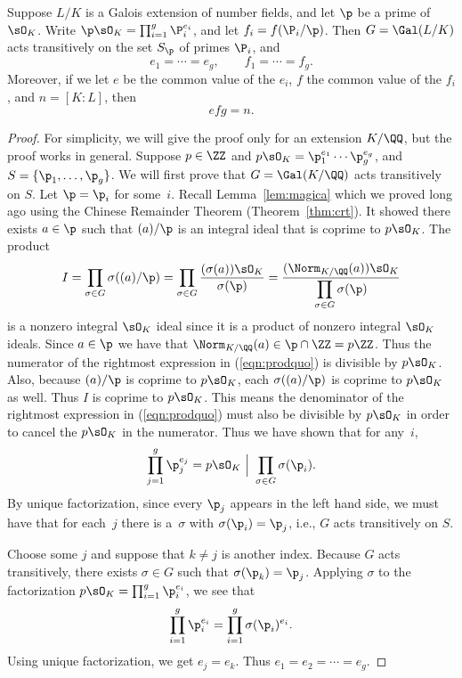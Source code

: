 \begin{theorem}\label{thm:transitive}
  Suppose $L/K$ is a Galois extension of number fields,
  and let $\p$ be a prime of $\sO_K$.
  Write $\p\sO_K = \prod_{i=1}^g \P_i^{e_i}$, and let $f_i = f(\P_i/\p)$.
  Then $G = \Gal(L/K)$ acts transitively on the set $S_\p$ of primes $\P_i$,
  and
  \[
    e_1 = \cdots = e_g, \qquad f_1 = \cdots = f_g.
  \]
  Moreover, if we let $e$ be the common value of the $e_i$,
  $f$ the common value of the $f_i$, and $n = [K:L]$, then
  \[
    efg = n.
  \]
\end{theorem}
\begin{proof}
  For simplicity, we will give the proof only for an extension $K/\QQ$, but
  the proof works in general. Suppose $p \in \ZZ$ and
  $p\sO_K = \p_1^{e_1}\cdots \p_g^{e_g}$, and $S = \{\p_1,\ldots, \p_g\}$.  We
  will first prove that $G = \Gal(K/\QQ)$ acts transitively on $S$.
  Let $\p = \p_i$ for some~$i$.
  Recall Lemma~\ref{lem:magica} which we proved long ago using the
  Chinese Remainder Theorem (Theorem~\ref{thm:crt}). It showed there exists
  $a\in\p$ such that $(a)/\p$ is an integral ideal that is
  coprime to $p\sO_K$.   The product
  \begin{equation}\label{eqn:prodquo}
    I = \prod_{\sigma\in G} \sigma((a)/\p)
    = \prod_{\sigma\in G} \frac{(\sigma(a))\sO_K}{\sigma(\p)}
    = \frac{(\Norm_{K/\QQ}(a))\sO_K}{\displaystyle \prod_{\sigma\in G} \sigma(\p)}
  \end{equation}
  is a nonzero integral $\sO_K$ ideal since it is a product of nonzero
  integral $\sO_K$ ideals.
  Since $a\in \p$ we have that
  $\Norm_{K/\QQ}(a) \in \p\cap\ZZ=p\ZZ$.  Thus the numerator of
  the rightmost expression in (\ref{eqn:prodquo}) is
  divisible by $p\sO_K$.   Also, because $(a)/\p$ is coprime
  to $p\sO_K$, each $\sigma((a)/\p)$ is coprime to $p\sO_K$
  as well.   Thus $I$ is coprime to $p\sO_K$.   This means the
  denominator of the rightmost expression in (\ref{eqn:prodquo})
  must also be divisible by $p\sO_K$ in order to cancel the $p\sO_K$
  in the numerator.  Thus we have shown that for any~$i$,
  \[
    \prod_{j=1}^g \p_j^{e_j}
    = p\sO_K \,\,\Big|\,\, \prod_{\sigma\in G} \sigma(\p_i).
  \]
  By unique factorization, since every $\p_j$ appears in the left hand
  side, we must have that for each~$j$ there is a~$\sigma$ with
  $\sigma(\p_i)=\p_j$, i.e., $G$ acts transitively on $S$.

  Choose some $j$ and suppose that $k\neq j$ is another index.  Because
  $G$ acts transitively, there exists $\sigma\in G$ such that
  $\sigma(\p_k)=\p_j$.  Applying $\sigma$ to the factorization $p\sO_K =
    \prod_{i=1}^g \p_i^{e_i}$, we see that
  \[
    \prod_{i=1}^g \p_i^{e_i} = \prod_{i=1}^g \sigma(\p_i)^{e_i}.
  \]
  Using unique factorization,
  we get $e_j = e_k$.  Thus $e_1=e_2=\cdots = e_g$.


\end{proof}
